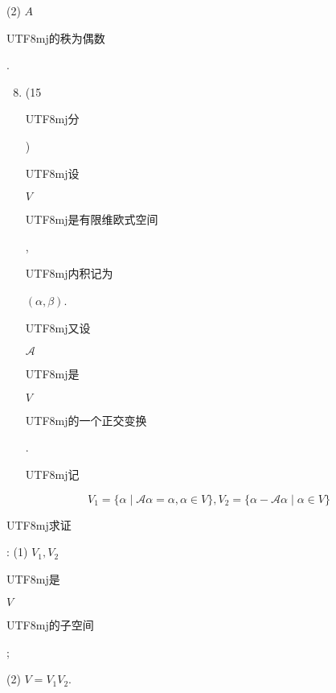 \documentclass[10pt]{article}
\begin{document}
(2) $A$ \begin{CJK}{UTF8}{mj}的秩为偶数\end{CJK}.

\begin{enumerate}
  \setcounter{enumi}{7}
  \item (15 \begin{CJK}{UTF8}{mj}分\end{CJK}) \begin{CJK}{UTF8}{mj}设\end{CJK} $V$ \begin{CJK}{UTF8}{mj}是有限维欧式空间\end{CJK}, \begin{CJK}{UTF8}{mj}内积记为\end{CJK} $(\alpha, \beta)$. \begin{CJK}{UTF8}{mj}又设\end{CJK} $\mathscr{A}$ \begin{CJK}{UTF8}{mj}是\end{CJK} $V$ \begin{CJK}{UTF8}{mj}的一个正交变换\end{CJK}. \begin{CJK}{UTF8}{mj}记\end{CJK}
\end{enumerate}
$$
V_{1}=\{\alpha \mid \mathscr{A} \alpha=\alpha, \alpha \in V\}, V_{2}=\{\alpha-\mathscr{A} \alpha \mid \alpha \in V\}
$$
\begin{CJK}{UTF8}{mj}求证\end{CJK}: (1) $V_{1}, V_{2}$ \begin{CJK}{UTF8}{mj}是\end{CJK} $V$ \begin{CJK}{UTF8}{mj}的子空间\end{CJK};

(2) $V=V_{1} V_{2}$.
\end{document}
